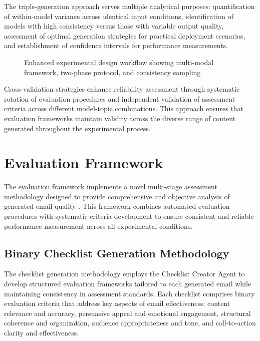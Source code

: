 The triple-generation approach serves multiple analytical purposes: quantification of within-model variance across identical input conditions, identification of models with high consistency versus those with variable output quality, assessment of optimal generation strategies for practical deployment scenarios, and establishment of confidence intervals for performance measurements.

\begin{figure}[htbp]
    \centering
    \caption{Enhanced experimental design workflow showing multi-modal framework, two-phase protocol, and consistency sampling}
    \label{fig:experimental-design}
\end{figure}

Cross-validation strategies enhance reliability assessment through systematic rotation of evaluation procedures and independent validation of assessment criteria across different model-topic combinations. This approach ensures that evaluation frameworks maintain validity across the diverse range of content generated throughout the experimental process.

\section{Evaluation Framework}
\label{sec:evaluation-framework}

The evaluation framework implements a novel multi-stage assessment methodology designed to provide comprehensive and objective analysis of generated email quality \cite{bohnet2022attributed_qa, pimentel2024beyond_metrics}. This framework combines automated evaluation procedures with systematic criteria development to ensure consistent and reliable performance measurement across all experimental conditions.

\subsection{Binary Checklist Generation Methodology}

The checklist generation methodology employs the Checklist Creator Agent to develop structured evaluation frameworks tailored to each generated email while maintaining consistency in assessment standards. Each checklist comprises binary evaluation criteria that address key aspects of email effectiveness: content relevance and accuracy, persuasive appeal and emotional engagement, structural coherence and organization, audience appropriateness and tone, and call-to-action clarity and effectiveness.

